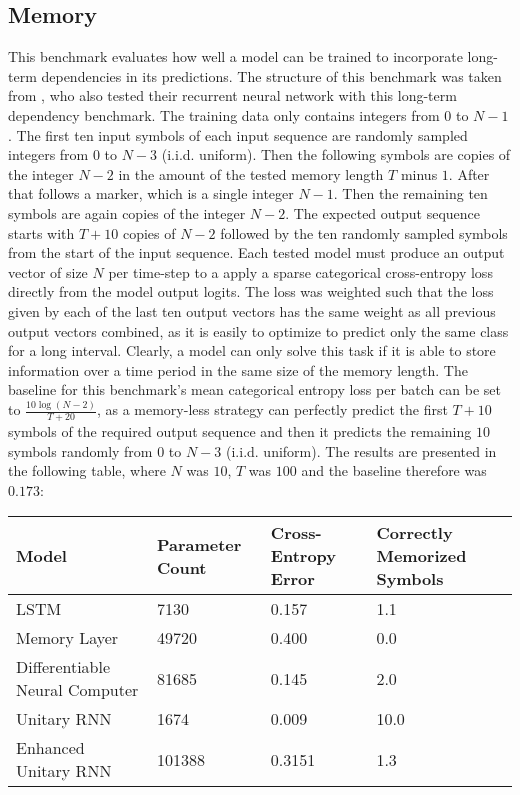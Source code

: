 \documentclass[draft,final]{vutinfth} %
\begin{document}
\subsection{Memory}
This benchmark evaluates how well a model can be trained to incorporate long-term dependencies in its predictions.
The structure of this benchmark was taken from \cite{UnitaryRNNs}, who also tested their recurrent neural network with this long-term dependency benchmark.
The training data only contains integers from $0$ to $N-1$. The first ten input symbols of each input sequence are randomly sampled integers from $0$ to $N-3$ (i.i.d. uniform). 
Then the following symbols are copies of the integer $N-2$ in the amount of the tested memory length $T$ minus $1$. 
After that follows a marker, which is a single integer $N-1$. 
Then the remaining ten symbols are again copies of the integer $N-2$. 
The expected output sequence starts with $T+10$ copies of $N-2$ followed by the ten randomly sampled symbols from the start of the input sequence.
Each tested model must produce an output vector of size $N$ per time-step to a apply a sparse categorical cross-entropy loss directly from the model output logits.
The loss was weighted such that the loss given by each of the last ten output vectors has the same weight as all previous output vectors combined, as it is easily to optimize to predict only the same class for a long interval.
Clearly, a model can only solve this task if it is able to store information over a time period in the same size of the memory length.
The baseline for this benchmark's mean categorical entropy loss per batch can be set to $\frac{10\log(N-2)}{T+20}$, as a memory-less strategy can perfectly predict the first $T+10$ symbols of the required output sequence and then it predicts the remaining $10$ symbols randomly from $0$ to $N-3$ (i.i.d. uniform).
The results are presented in the following table, where $N$ was $10$, $T$ was $100$ and the baseline therefore was $0.173$:
\begin{table}[h]
\begin{tabular}{llll}
\hline
Model & Parameter Count & Cross-Entropy Error & Correctly Memorized Symbols \\ \hline
LSTM & 7130 & 0.157 & 1.1 \\ 
Memory Layer & 49720 & 0.400 & 0.0 \\
Differentiable Neural Computer & 81685 & 0.145 & 2.0 \\
Unitary RNN & 1674 & 0.009 & 10.0 \\
Enhanced Unitary RNN & 101388 & 0.3151 & 1.3 \\
\end{tabular}
\end{table}
\end{document}
